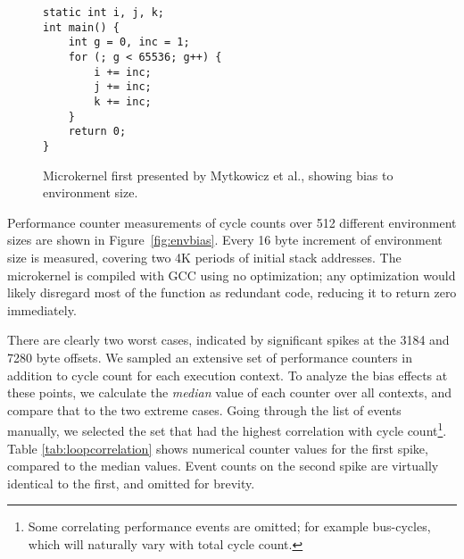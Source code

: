 \documentclass[10pt, conference, compsocconf]{IEEEtran}
\begin{document}
\begin{figure}[t]
  \begin{lstlisting}[frame=single, xleftmargin=.01\textwidth, xrightmargin=.01\textwidth]
static int i, j, k;
int main() {
    int g = 0, inc = 1;
    for (; g < 65536; g++) {
        i += inc;
        j += inc;
        k += inc;
    }
    return 0;
}
  \end{lstlisting}
  \caption{\label{fig:microkernel}Microkernel first presented by Mytkowicz et al.\cite{Mytkowicz:2009:WrongData}, showing bias to environment size.}
\end{figure}

\begin{figure*}[t]
  \caption{Bias from environment size for microkernel. Measured average of 10 cycle count samples for 512 different environments. Spikes show aliasing case, occurring once for each 4K period.}
  \label{fig:envbias}
\end{figure*}

Performance counter measurements of cycle counts over 512 different environment sizes are shown in Figure~\ref{fig:envbias}.
Every 16 byte increment of environment size is measured, covering two 4K periods of initial stack addresses.
The microkernel is compiled with {\small{GCC}} using no optimization; any optimization would likely disregard most of the function as redundant code, reducing it to return zero immediately.

There are clearly two worst cases, indicated by significant spikes at the 3184 and 7280 byte offsets.
We sampled an extensive set of performance counters in addition to cycle count for each execution context.
To analyze the bias effects at these points, we calculate the \emph{median} value of each counter over all contexts, and compare that to the two extreme cases.
Going through the list of events manually, we selected the set that had the highest correlation with cycle count\footnote{Some correlating performance events are omitted; for example bus-cycles, which will naturally vary with total cycle count.}.
Table \ref{tab:loopcorrelation} shows numerical counter values for the first spike, compared to the median values. Event counts on the second spike are virtually identical to the first, and omitted for brevity.
\end{document}
